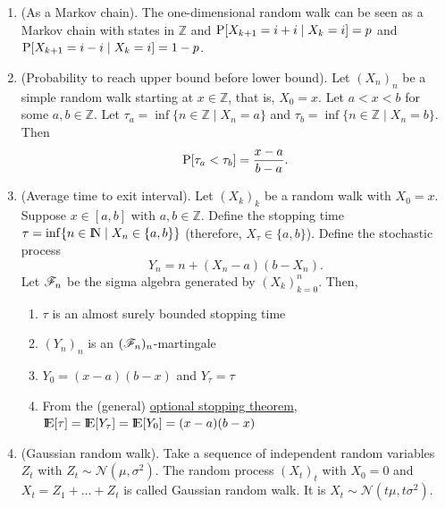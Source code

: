\documentclass[a4paper,10pt]{scrbook}
\begin{document}
\begin{enumerate}
 \item (As a Markov chain). The one-dimensional random walk can be seen as a Markov chain with 
       states in $\mathbb{Z}$ and $\mathrm{P}[X_{k+1}=i+i\mid X_{k}=i] = p$ and $\mathrm{P}[X_{k+1}=i-i\mid X_{k}=i] = 1-p$.
       
 \item (Probability to reach upper bound before lower bound). 
       Let $(X_n)_n$ be a simple random walk starting at $x\in\mathbb{Z}$, that is, $X_0 = x$.
       Let $a < x < b$ for some $a,b\in\mathbb{Z}$. Let $\tau_a = \inf\{n\in\mathbb{Z} \mid X_n = a\}$
       and $\tau_b = \inf\{n\in\mathbb{Z} \mid X_n = b\}$. Then
       \[
        \mathrm{P}[\tau_a < \tau_b] = \frac{x-a}{b-a}.
       \]

 \item (Average time to exit interval). Let $(X_k)_k$ be a random walk with $X_0 = x$.
       Suppose $x\in [a,b]$ with $a,b\in\mathbb{Z}$. Define the stopping time 
       $\tau = \inf\{n\in\N \mid X_n \in \{a,b\}\}$ (therefore, $X_\tau\in\{a,b\}$).
       Define the stochastic process
       \[
        Y_n = n + (X_n-a)(b - X_n).
       \]
       Let \(\mathscr{F}_n\) be the sigma algebra generated by $(X_k)_{k=0}^{n}$.
       Then, 
       \begin{enumerate}
        \item \(\tau\) is an almost surely bounded stopping time
        \item \((Y_n)_n\) is an $(\mathscr{F}_n)_n$-martingale
        \item \(Y_0 = (x-a)(b-x)\) and \(Y_\tau = \tau\)
        \item From the (general) \hyperlink{link:ost3}{optional stopping theorem}, 
              $\E[\tau] = \E[Y_\tau] = \E[Y_0] = (x-a)(b-x)$
       \end{enumerate}

       
 \item (Gaussian random walk). Take a sequence of independent random variables \(Z_{t}\) with \(Z_t\sim\mathcal{N}(\mu, \sigma^2)\).
       The random process \((X_t)_t\) with \(X_0=0\) and \(X_t = Z_1+\ldots+Z_t\) is called Gaussian random walk.
       It is \(X_t\sim \mathcal{N}(t\mu, t\sigma^2)\).       
\end{enumerate}
\end{document}
